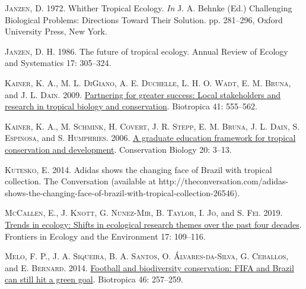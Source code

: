 \documentclass[
  12pt,
  man, donotrepeattitle,floatsintext]{apa6}
\newlength{\cslhangindent}
\newlength{\cslentryspacingunit} %
\newenvironment{CSLReferences}[2] %
 {%
  \setlength{\parindent}{0pt}
  \ifodd #1
  \let\oldpar\par
  \def\par{\hangindent=\cslhangindent\oldpar}
  \fi
  \setlength{\parskip}{#2\cslentryspacingunit}
 }%
 {}
\begin{document}
\begin{CSLReferences}{1}{0}
\leavevmode{}%
\textsc{Janzen, D.} 1972. Whither {Tropical Ecology}. \emph{In} J. A. Behnke (Ed.) Challenging {Biological Problems}: {Directions Toward Their Solution}. pp. 281--296, Oxford University Press, New York.

\leavevmode{}%
\textsc{Janzen, D. H.} 1986. The future of tropical ecology. Annual Review of Ecology and Systematics 17: 305--324.

\leavevmode{}%
\textsc{Kainer, K. A.}, \textsc{M. L. DiGiano}, \textsc{A. E. Duchelle}, \textsc{L. H. O. Wadt}, \textsc{E. M. Bruna}, and \textsc{J. L. Dain}. 2009. \href{https://doi.org/10.1111/j.1744-7429.2009.00560.x}{Partnering for greater success: Local stakeholders and research in tropical biology and conservation}. Biotropica 41: 555--562.

\leavevmode{}%
\textsc{Kainer, K. A.}, \textsc{M. Schmink}, \textsc{H. Covert}, \textsc{J. R. Stepp}, \textsc{E. M. Bruna}, \textsc{J. L. Dain}, \textsc{S. Espinosa}, and \textsc{S. Humphries}. 2006. \href{https://doi.org/10.1111/j.1523-1739.2006.00356.x}{A graduate education framework for tropical conservation and development}. Conservation Biology 20: 3--13.

\leavevmode{}%
\textsc{Kutesko, E.} 2014. Adidas shows the changing face of {Brazil} with tropical collection. The Conversation (available at http://theconversation.com/adidas-shows-the-changing-face-of-brazil-with-tropical-collection-26546).

\leavevmode{}%
\textsc{McCallen, E.}, \textsc{J. Knott}, \textsc{G. Nunez-Mir}, \textsc{B. Taylor}, \textsc{I. Jo}, and \textsc{S. Fei}. 2019. \href{https://doi.org/10.1002/fee.1993}{Trends in ecology: Shifts in ecological research themes over the past four decades}. Frontiers in Ecology and the Environment 17: 109--116.

\leavevmode{}%
\textsc{Melo, F. P.}, \textsc{J. A. Siqueira}, \textsc{B. A. Santos}, \textsc{O. Álvares-da-Silva}, \textsc{G. Ceballos}, and \textsc{E. Bernard}. 2014. \href{https://doi.org/10.1111/btp.12114}{{Football and biodiversity conservation: FIFA and Brazil can still hit a green goal}}. Biotropica 46: 257--259.


\end{CSLReferences}
\end{document}
